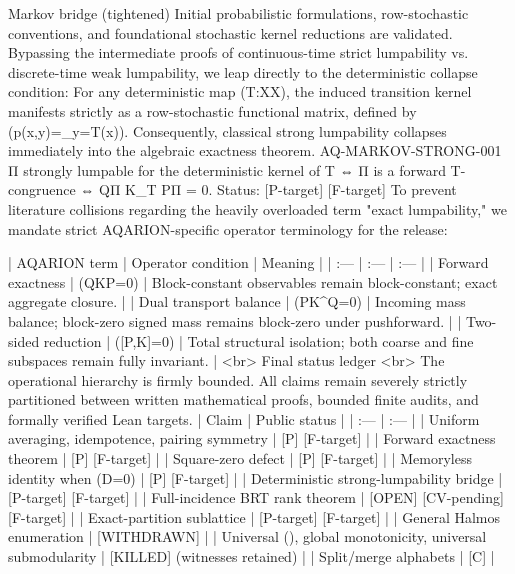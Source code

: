 Markov bridge (tightened)
Initial probabilistic formulations, row-stochastic conventions, and foundational stochastic kernel reductions are validated. Bypassing the intermediate proofs of continuous-time strict lumpability vs. discrete-time weak lumpability, we leap directly to the deterministic collapse condition:
For any deterministic map (T:X\to X), the induced transition kernel manifests strictly as a row-stochastic functional matrix, defined by (p(x,y)=_{y=T(x)}). Consequently, classical strong lumpability collapses immediately into the algebraic exactness theorem.
AQ-MARKOV-STRONG-001
Π strongly lumpable for the deterministic kernel of T
⇔ Π is a forward T-congruence
⇔ QΠ K_T PΠ = 0.
Status: [P-target] [F-target]
To prevent literature collisions regarding the heavily overloaded term "exact lumpability," we mandate strict AQARION-specific operator terminology for the release:

| AQARION term | Operator condition | Meaning |
| :--- | :--- | :--- |
| Forward exactness | (QKP=0) | Block-constant observables remain block-constant; exact aggregate closure. |
| Dual transport balance | (PK^\top Q=0) | Incoming mass balance; block-zero signed mass remains block-zero under pushforward. |
| Two-sided reduction | ([P,K]=0) | Total structural isolation; both coarse and fine subspaces remain fully invariant. | <br> Final status ledger <br> The operational hierarchy is firmly bounded. All claims remain severely strictly partitioned between written mathematical proofs, bounded finite audits, and formally verified Lean targets.
| Claim | Public status |
| :--- | :--- |
| Uniform averaging, idempotence, pairing symmetry | [P] [F-target] |
| Forward exactness theorem | [P] [F-target] |
| Square-zero defect | [P] [F-target] |
| Memoryless identity when (D=0) | [P] [F-target] |
| Deterministic strong-lumpability bridge | [P-target] [F-target] |
| Full-incidence BRT rank theorem | [OPEN] [CV-pending] [F-target] |
| Exact-partition sublattice | [P-target] [F-target] |
| General Halmos enumeration | [WITHDRAWN] |
| Universal (\kappa), global monotonicity, universal submodularity | [KILLED] (witnesses retained) |
| Split/merge alphabets | [C] |

